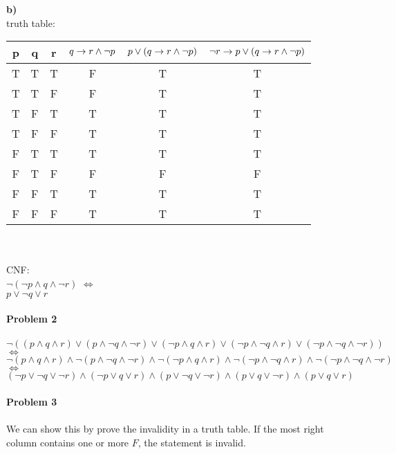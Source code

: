 \documentclass[12pt,oneside,reqno]{amsart}
\begin{document}
\textbf{b)}\\
truth table:\\
	\begin{tabular}{ ccc|c|c|c }
		p & q & r & $q \rightarrow{} r \land \neg p$ & $p \lor (q \rightarrow{} r \land \neg p)$ & $\neg r \rightarrow{} p \lor (q \rightarrow{} r \land \neg p)$ \\ \hline
		T & T & T &	 F & T & T \\
		T & T & F &	 F & T & T \\
		T & F & T &	 T & T & T \\
		T & F & F &	 T & T & T \\
		F & T & T &	 T & T & T \\
		F & T & F &	 F & F & F \\
		F & F & T &	 T & T & T \\
		F & F & F &	 T & T & T \\
	\end{tabular}\\\\
CNF:\\
$\neg(\neg p \land q \land \neg r)$
$\Leftrightarrow$\\
$p \lor \neg q \lor r$\\\\

\textbf{Problem 2}\\\\
$\neg((p\land q \land r) \lor (p \land \neg q \land \neg r) \lor (\neg p \land q \land r) \lor (\neg p \land \neg q \land r) \lor (\neg p \land \neg q \land \neg r))$
$\Leftrightarrow$\\
$\neg(p\land q \land r) \land \neg(p \land \neg q \land \neg r) \land \neg(\neg p \land q \land r) \land \neg(\neg p \land \neg q \land r) \land \neg(\neg p \land \neg q \land \neg r)$
$\Leftrightarrow$\\
$(\neg p \lor \neg q \lor \neg r) \land (\neg p \lor q \lor r) \land (p \lor \neg q \lor \neg r) \land (p \lor q \lor \neg r) \land (p \lor q \lor r)$\\\\

\textbf{Problem 3}\\\\
We can show this by prove the invalidity in a truth table. If the most right column contains one or more $F$, the statement is invalid.\\
\end{document}
